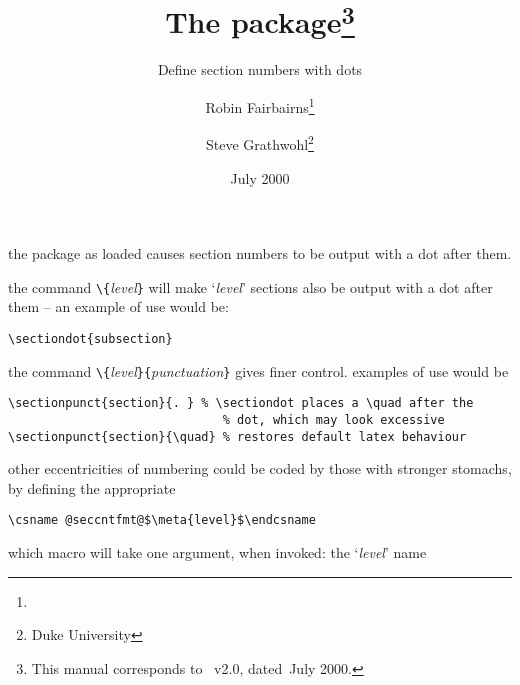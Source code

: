\documentclass[pagesize=auto, fontsize=12pt, DIV=10, parskip=half]{scrartcl}
\title{The \pkg{secdot} package\thanks{This manual corresponds to \pkg{secdot.sty}~v2.0, dated~July 2000.}}
\subtitle{Define section numbers with dots}
\author{%
  Robin Fairbairns\thanks{\mail{rf10@cl.cam.ac.uk}}%
  \and Steve Grathwohl\thanks{Duke University}%
}
\date{July 2000}
\makeatletter
\newcommand*{\cs}[1]{\texttt{\textbackslash#1}}
\newcommand*{\cmd}[1]{\cs{\expandafter\@gobble\string#1}}
\newcommand*{\meta}[1]{\textlangle\textsl{#1}\textrangle}
\newcommand*{\marg}[1]{\texttt{\{}\meta{#1}\texttt{\}}}
\makeatother
\begin{document}
\maketitle

the package as loaded causes section numbers to be output with a dot
after them.

the command \cmd{\sectiondot}\marg{level} will make `\meta{level}' sections also be
output with a dot after them -- an example of use would be:
%
\begin{lstlisting}
\sectiondot{subsection}
\end{lstlisting}

the command \cmd{\sectionpunct}\marg{level}\marg{punctuation} gives finer
control.  examples of use would be
%
\begin{lstlisting}
\sectionpunct{section}{. } % \sectiondot places a \quad after the
                              % dot, which may look excessive
\sectionpunct{section}{\quad} % restores default latex behaviour
\end{lstlisting}

other eccentricities of numbering could be coded by those with
stronger stomachs, by defining the appropriate
%
\begin{lstlisting}
\csname @seccntfmt@$\meta{level}$\endcsname
\end{lstlisting}
%
which macro will take one argument, when invoked: the `\meta{level}' name
\end{document}
